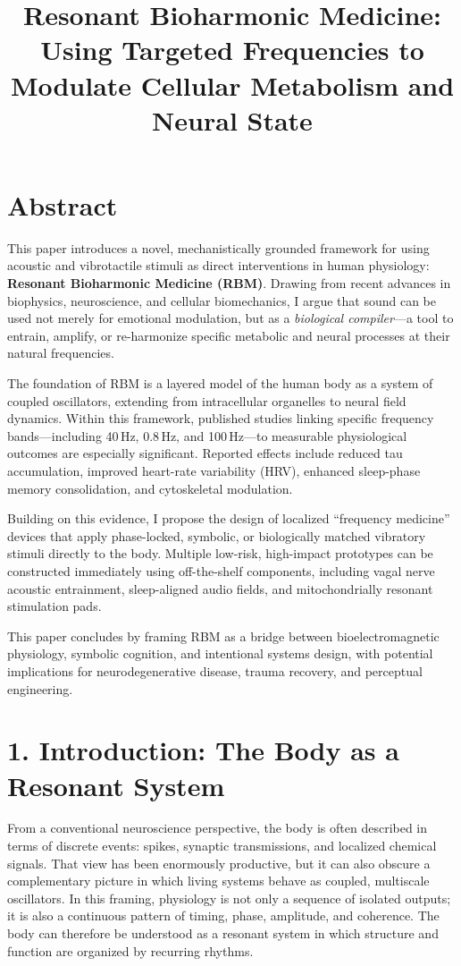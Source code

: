 \documentclass[11pt]{article}
\title{Resonant Bioharmonic Medicine: Using Targeted Frequencies to Modulate Cellular Metabolism and Neural State}
\author{}
\begin{document}
\maketitle

\section{Abstract}

This paper introduces a novel, mechanistically grounded framework for using acoustic and vibrotactile stimuli as direct interventions in human physiology: \textbf{Resonant Bioharmonic Medicine (RBM)}. Drawing from recent advances in biophysics, neuroscience, and cellular biomechanics, I argue that sound can be used not merely for emotional modulation, but as a \emph{biological compiler}---a tool to entrain, amplify, or re-harmonize specific metabolic and neural processes at their natural frequencies.

The foundation of RBM is a layered model of the human body as a system of coupled oscillators, extending from intracellular organelles to neural field dynamics. Within this framework, published studies linking specific frequency bands---including 40\,Hz, 0.8\,Hz, and 100\,Hz---to measurable physiological outcomes are especially significant. Reported effects include reduced tau accumulation, improved heart-rate variability (HRV), enhanced sleep-phase memory consolidation, and cytoskeletal modulation.

Building on this evidence, I propose the design of localized ``frequency medicine'' devices that apply phase-locked, symbolic, or biologically matched vibratory stimuli directly to the body. Multiple low-risk, high-impact prototypes can be constructed immediately using off-the-shelf components, including vagal nerve acoustic entrainment, sleep-aligned audio fields, and mitochondrially resonant stimulation pads.

This paper concludes by framing RBM as a bridge between bioelectromagnetic physiology, symbolic cognition, and intentional systems design, with potential implications for neurodegenerative disease, trauma recovery, and perceptual engineering.


\section{1. Introduction: The Body as a Resonant System}

From a conventional neuroscience perspective, the body is often described in terms of discrete events: spikes, synaptic transmissions, and localized chemical signals. That view has been enormously productive, but it can also obscure a complementary picture in which living systems behave as coupled, multiscale oscillators. In this framing, physiology is not only a sequence of isolated outputs; it is also a continuous pattern of timing, phase, amplitude, and coherence. The body can therefore be understood as a resonant system in which structure and function are organized by recurring rhythms.
\end{document}
